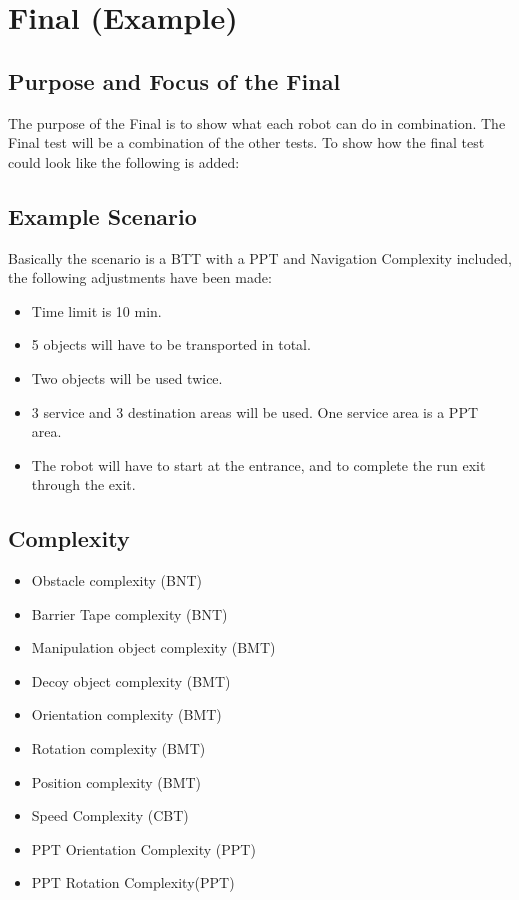 \section{Final (Example)}
\label{sec:Final}

\subsection{Purpose and Focus of the Final}
The purpose of the Final is to show what each robot can do in combination. The Final test will be a combination of the other tests. To show how the final test could look like the following is added:

\subsection{Example Scenario}

Basically the scenario is a BTT with a PPT and Navigation Complexity included, the following adjustments have been made:

\begin{itemize}
\item Time limit is 10 min.
\item 5 objects will have to be transported in total.
\item Two objects will be used twice.
\item 3 service and 3 destination areas will be used. One service area is a PPT area.
\item The robot will have to start at the entrance, and to complete the run exit through the exit.
\end{itemize}


\subsection{Complexity}
	
\begin{itemize}
\item Obstacle complexity (BNT)
\item Barrier Tape complexity (BNT)
\item Manipulation object complexity (BMT)
\item Decoy object complexity (BMT)
\item Orientation complexity (BMT)
\item Rotation complexity (BMT)
\item Position complexity (BMT)
\item Speed Complexity (CBT)
\item PPT Orientation Complexity (PPT)
\item PPT Rotation Complexity(PPT)
\end{itemize}

